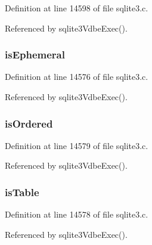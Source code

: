 Definition at line 14598 of file sqlite3.\+c.



Referenced by sqlite3\+Vdbe\+Exec().

\hypertarget{struct_vdbe_cursor_a53dd61c651247c5df3d3a1f701032a0b}{}
\subsubsection[{is\+Ephemeral}]{ is\+Ephemeral}\label{struct_vdbe_cursor_a53dd61c651247c5df3d3a1f701032a0b}


Definition at line 14576 of file sqlite3.\+c.



Referenced by sqlite3\+Vdbe\+Exec().

\hypertarget{struct_vdbe_cursor_af467d3110dfc862dd5481f487ae62af6}{}
\subsubsection[{is\+Ordered}]{ is\+Ordered}\label{struct_vdbe_cursor_af467d3110dfc862dd5481f487ae62af6}


Definition at line 14579 of file sqlite3.\+c.



Referenced by sqlite3\+Vdbe\+Exec().

\hypertarget{struct_vdbe_cursor_a6ab8dc1239f77f0296812916d43e973e}{}
\subsubsection[{is\+Table}]{ is\+Table}\label{struct_vdbe_cursor_a6ab8dc1239f77f0296812916d43e973e}


Definition at line 14578 of file sqlite3.\+c.



Referenced by sqlite3\+Vdbe\+Exec().

\hypertarget{struct_vdbe_cursor_a0684b330a73a8653f256e762327cb99b}{}
